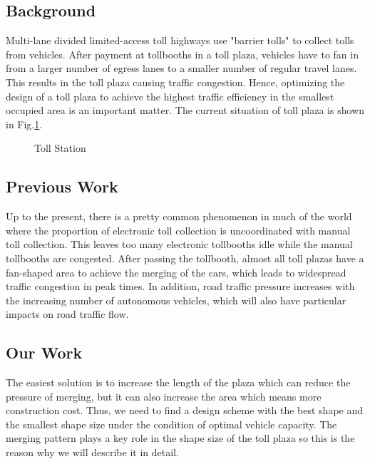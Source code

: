 \documentclass{mcmthesis}
\begin{document}
\subsection{Background}
Multi-lane divided limited-access toll highways use "barrier tolls" to collect tolls from vehicles. After payment at tollbooths in a toll plaza, vehicles have to fan in from a larger number of egress lanes to a smaller number of regular travel lanes. This results in the toll plaza causing traffic congestion. Hence, optimizing the design of a toll plaza to achieve the highest traffic efficiency in the smallest occupied area is an important matter.
The current situation of toll plaza is shown in Fig.\ref{fig:toll}.
	\begin{figure}[!htbp]
		\centering
		\caption{\label{fig:toll}Toll Station}
	\end{figure}
	
\subsection{Previous Work}
Up to the present, there is a pretty common phenomenon in much of the world where the proportion of electronic toll collection is uncoordinated with manual toll collection. This leaves too many electronic tollbooths idle while the manual tollbooths are congested. After passing the tollbooth, almost all toll plazas have a fan-shaped area to achieve the merging of the cars, which leads to widespread traffic congestion in peak times. In addition, road traffic pressure increases with the increasing number of autonomous vehicles, which will also have particular impacts on road traffic flow.
\subsection{Our Work}
The easiest solution is to increase the length of the plaza which can reduce the pressure of merging, but it can also increase the area which means more construction cost. Thus, we need to find a design scheme with the best shape and the smallest shape size under the condition of optimal vehicle capacity. The merging pattern plays a key role in the shape size of the toll plaza so this is the reason why we will describe it in detail.
	
\end{document}
